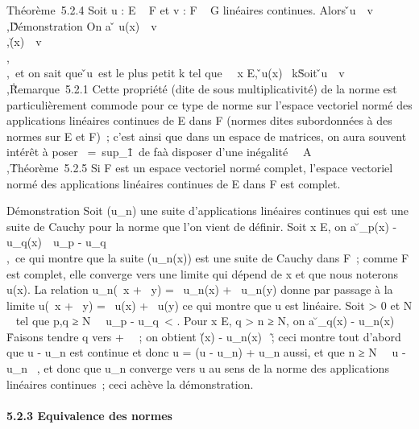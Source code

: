 \documentclass[]{article}
\begin{document}
Théorème~5.2.4 Soit u : E \rightarrow~ F et v : F \rightarrow~ G linéaires continues. Alors
\v \cdot u\
\leq\
v\\,\u\.

Démonstration On a \v \cdot
u(x)\ \leq\
v\\,\u(x)\
\leq\
v\\,\u\\,\x\
et on sait que \v \cdot u\
est le plus petit k tel que \forall~~x \in E,
\v \cdot u(x)\ \leq
k\x\. Soit
\v \cdot u\
\leq\
v\\,\u\.

Remarque~5.2.1 Cette propriété (dite de sous multiplicativité) de la
norme est particulièrement commode pour ce type de norme sur l'espace
vectoriel normé des applications linéaires continues de E dans F (normes
dites subordonnées à des normes sur E et F)~; c'est ainsi que dans un
espace de matrices, on aura souvent intérêt à poser
\A\
=\
sup_\X\=1\AX\
de fa\ccon à disposer d'une inégalité
\AB\
\leq\
A\\,\B\.

Théorème~5.2.5 Si F est un espace vectoriel normé complet, l'espace
vectoriel normé des applications linéaires continues de E dans F est
complet.

Démonstration Soit (u_n) une suite d'applications linéaires
continues qui est une suite de Cauchy pour la norme que l'on vient de
définir. Soit x \in E, on a \u_p(x) -
u_q(x)\ \leq\
u_p -
u_q\\,\x\,
ce qui montre que la suite (u_n(x)) est une suite de Cauchy
dans F~; comme F est complet, elle converge vers une limite qui dépend
de x et que nous noterons u(x). La relation u_n(\alpha~x + \beta~y) =
\alpha~u_n(x) + \beta~u_n(y) donne par passage à la limite u(\alpha~x +
\beta~y) = \alpha~u(x) + \beta~u(y) ce qui montre que u est linéaire. Soit \epsilon
> 0 et N \in \mathbb{N}~ tel que p,q ≥ N \rigtharrow~\
u_p - u_q\ < \epsilon.
Pour x \in E, q > n ≥ N, on a
\u_q(x) -
u_n(x)\ \leq
\epsilon\x\. Faisons tendre q
vers + \infty~~; on obtient \u(x) -
u_n(x)\ \leq
\epsilon\x\~; ceci montre
tout d'abord que u - u_n est continue et donc u = (u -
u_n) + u_n aussi, et que n ≥ N
\rigtharrow~\ u - u_n\ \leq
\epsilon, et donc que u_n converge vers u au sens de la norme des
applications linéaires continues~; ceci achève la démonstration.

\paragraph{5.2.3 Equivalence des normes}
\end{document}
